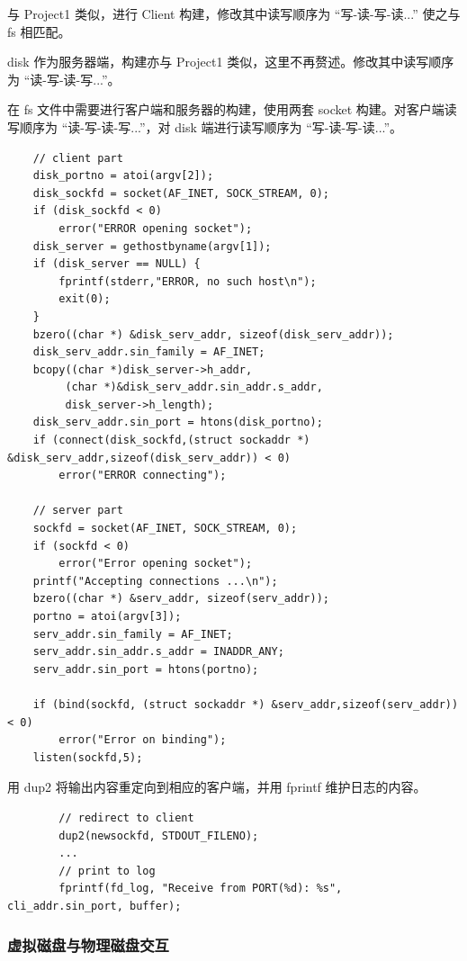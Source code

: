 \documentclass{article}
\begin{document}
与 Project1 类似，进行 Client 构建，修改其中读写顺序为 “写-读-写-读...” 使之与 fs 相匹配。

disk 作为服务器端，构建亦与 Project1 类似，这里不再赘述。修改其中读写顺序为  “读-写-读-写...”。

在 fs 文件中需要进行客户端和服务器的构建，使用两套 socket 构建。对客户端读写顺序为 “读-写-读-写...”，对 disk 端进行读写顺序为 “写-读-写-读...”。

\begin{lstlisting}
	// client part
    disk_portno = atoi(argv[2]);
    disk_sockfd = socket(AF_INET, SOCK_STREAM, 0);
    if (disk_sockfd < 0) 
        error("ERROR opening socket");
    disk_server = gethostbyname(argv[1]);
    if (disk_server == NULL) {
        fprintf(stderr,"ERROR, no such host\n");
        exit(0);
    }
    bzero((char *) &disk_serv_addr, sizeof(disk_serv_addr));
    disk_serv_addr.sin_family = AF_INET;
    bcopy((char *)disk_server->h_addr, 
         (char *)&disk_serv_addr.sin_addr.s_addr,
         disk_server->h_length);
    disk_serv_addr.sin_port = htons(disk_portno);
    if (connect(disk_sockfd,(struct sockaddr *) &disk_serv_addr,sizeof(disk_serv_addr)) < 0) 
        error("ERROR connecting");
    
    // server part
    sockfd = socket(AF_INET, SOCK_STREAM, 0);
    if (sockfd < 0) 
        error("Error opening socket");
    printf("Accepting connections ...\n");
    bzero((char *) &serv_addr, sizeof(serv_addr));
    portno = atoi(argv[3]);
    serv_addr.sin_family = AF_INET;
    serv_addr.sin_addr.s_addr = INADDR_ANY;
    serv_addr.sin_port = htons(portno);

    if (bind(sockfd, (struct sockaddr *) &serv_addr,sizeof(serv_addr)) < 0) 
        error("Error on binding");
    listen(sockfd,5);
\end{lstlisting}

用 dup2 将输出内容重定向到相应的客户端，并用 fprintf 维护日志的内容。

\begin{lstlisting}
		// redirect to client
        dup2(newsockfd, STDOUT_FILENO);
        ...
        // print to log
        fprintf(fd_log, "Receive from PORT(%d): %s", cli_addr.sin_port, buffer);
\end{lstlisting}

\subsubsection{虚拟磁盘与物理磁盘交互}
\end{document}
